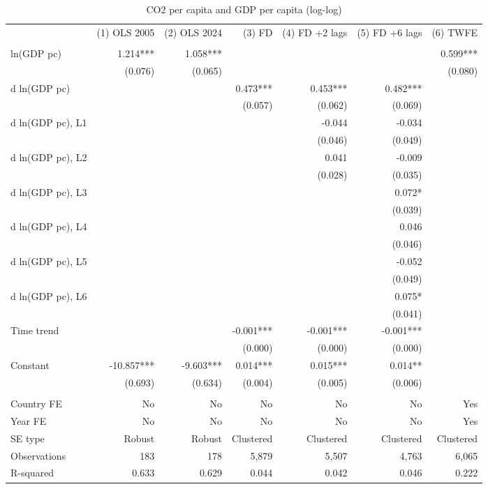 \begin{table}[h]
\centering
\caption{CO2 per capita and GDP per capita (log-log)}
\begin{tabular}{lrrrrrr}
\toprule
 & (1) OLS 2005 & (2) OLS 2024 & (3) FD & (4) FD +2 lags & (5) FD +6 lags & (6) TWFE \\
 &  &  &  &  &  &  \\
\midrule
ln(GDP pc) & 1.214*** & 1.058*** &  &  &  & 0.599*** \\
 & (0.076) & (0.065) &  &  &  & (0.080) \\
d ln(GDP pc) &  &  & 0.473*** & 0.453*** & 0.482*** &  \\
 &  &  & (0.057) & (0.062) & (0.069) &  \\
d ln(GDP pc), L1 &  &  &  & -0.044 & -0.034 &  \\
 &  &  &  & (0.046) & (0.049) &  \\
d ln(GDP pc), L2 &  &  &  & 0.041 & -0.009 &  \\
 &  &  &  & (0.028) & (0.035) &  \\
d ln(GDP pc), L3 &  &  &  &  & 0.072* &  \\
 &  &  &  &  & (0.039) &  \\
d ln(GDP pc), L4 &  &  &  &  & 0.046 &  \\
 &  &  &  &  & (0.046) &  \\
d ln(GDP pc), L5 &  &  &  &  & -0.052 &  \\
 &  &  &  &  & (0.049) &  \\
d ln(GDP pc), L6 &  &  &  &  & 0.075* &  \\
 &  &  &  &  & (0.041) &  \\
Time trend &  &  & -0.001*** & -0.001*** & -0.001*** &  \\
 &  &  & (0.000) & (0.000) & (0.000) &  \\
Constant & -10.857*** & -9.603*** & 0.014*** & 0.015*** & 0.014** &  \\
 & (0.693) & (0.634) & (0.004) & (0.005) & (0.006) &  \\
 &  &  &  &  &  &  \\
Country FE & No & No & No & No & No & Yes \\
Year FE & No & No & No & No & No & Yes \\
SE type & Robust & Robust & Clustered & Clustered & Clustered & Clustered \\
Observations & 183 & 178 & 5,879 & 5,507 & 4,763 & 6,065 \\
R-squared & 0.633 & 0.629 & 0.044 & 0.042 & 0.046 & 0.222 \\
\bottomrule
\end{tabular}
\end{table}
